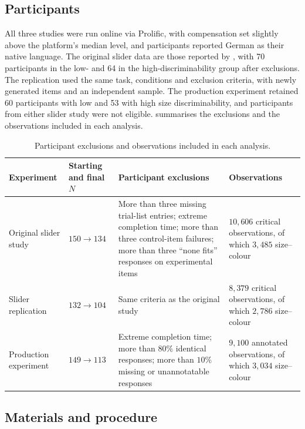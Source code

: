 \documentclass[10pt,a4paper,fleqn]{article}
\begin{document}
\subsection{Participants}

All three studies were run online via Prolific, with compensation set slightly above the platform's median level, and participants reported German as their native language.
The original slider data are those reported by \citet{schlotterbeck2023incremental}, with 70 participants in the low- and 64 in the high-discriminability group after exclusions.
The replication used the same task, conditions and exclusion criteria, with newly generated items and an independent sample.
The production experiment retained 60 participants with low and 53 with high size discriminability, and participants from either slider study were not eligible.
 summarises the exclusions and the observations included in each analysis.

\begin{table}[H]
\centering
\caption{Participant exclusions and observations included in each analysis.}
\label{tab:exclusion-transparency}
\footnotesize
\setlength{\tabcolsep}{3pt}
\begin{tabularx}{\textwidth}{>{\raggedright\arraybackslash}p{2.2cm}>{\raggedright\arraybackslash}p{2.0cm}>{\raggedright\arraybackslash}p{5.7cm}>{\raggedright\arraybackslash}X}
\toprule
Experiment & Starting and final $N$ & Participant exclusions & Observations \\
\midrule
Original slider study & $150 \rightarrow 134$ & More than three missing trial-list entries; extreme completion time; more than three control-item failures; more than three ``none fits'' responses on experimental items & $10{,}606$ critical observations, of which $3{,}485$ size--colour \\
Slider replication & $132 \rightarrow 104$ & Same criteria as the original study & $8{,}379$ critical observations, of which $2{,}786$ size--colour \\
Production experiment & $149 \rightarrow 113$ & Extreme completion time; more than $80\%$ identical responses; more than $10\%$ missing or unannotatable responses & $9{,}100$ annotated observations, of which $3{,}034$ size--colour \\
\bottomrule
\end{tabularx}
\end{table}

\subsection{Materials and procedure}
\end{document}
